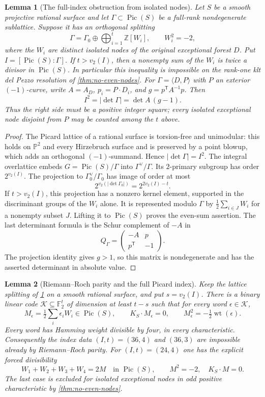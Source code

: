 \documentclass[11pt,reqno]{amsart}
\newtheorem{lemma}[lemma]{Lemma}
\theoremstyle{definition}
\theoremstyle{remark}
\DeclareMathOperator{\Pic}{Pic}
\newcommand{\PP}{\mathbb P}
\newcommand{\FF}{\mathbb F}
\newcommand{\ZZ}{\mathbb Z}
\numberwithin{equation}{section}
\begin{document}
\begin{lemma}[The full-index obstruction from isolated nodes]
\label{lem:picard-index}
Let $S$ be a smooth projective rational surface and let
$\Gamma\subset\Pic(S)$ be a full-rank nondegenerate sublattice.
Suppose it has an orthogonal splitting
\[
 \Gamma=\Gamma_0\oplus\bigoplus_{i=1}^t\ZZ[W_i],\qquad W_i^2=-2,
\]
where the $W_i$ are distinct isolated nodes of the original exceptional
forest $D$. Put $I=[\Pic(S):\Gamma]$.
If $t>v_2(I)$, then a nonempty sum of the $W_i$ is twice a divisor
in $\Pic(S)$. In particular this inequality is impossible on the
rank-one klt del Pezzo resolution of \cref{thm:no-even-nodes}.
For $\Gamma=\langle D,P\rangle$ with $P$ an exterior $(-1)$-curve,
write $A=A_D$, $p_i=P\cdot D_i$, and $g=p^{\mathsf T}A^{-1}p$.
Then
\[
 I^2=|\det\Gamma|=\det A\,(g-1).
\]
Thus the right side must be a positive integer square; every isolated
exceptional node disjoint from $P$ may be counted among the $t$ above.
\end{lemma}

\begin{proof}
The Picard lattice of a rational surface is torsion-free and unimodular:
this holds on $\PP^2$ and every Hirzebruch surface and is preserved
by a point blowup, which adds an orthogonal $(-1)$-summand.
Hence $|\det\Gamma|=I^2$.
The integral overlattice embeds
$G=\Pic(S)/\Gamma$ into $\Gamma^\vee/\Gamma$.
Its $2$-primary subgroup has order $2^{v_2(I)}$.
The projection to $\Gamma_0^\vee/\Gamma_0$ has image of order at most
\[
 2^{v_2(|\det\Gamma_0|)}=2^{2v_2(I)-t}.
\]
If $t>v_2(I)$, this projection has a nonzero kernel element, supported
in the discriminant groups of the $W_i$ alone. It is represented modulo
$\Gamma$ by $\frac12\sum_{i\in J}W_i$ for a nonempty subset $J$.
Lifting it to $\Pic(S)$ proves the even-sum assertion.
The last determinant formula is the Schur complement of $-A$ in
\[
 Q_\Gamma=\begin{pmatrix}-A&p\\p^{\mathsf T}&-1\end{pmatrix}.
\]
The projection identity gives $g>1$, so this matrix is nondegenerate and
has the asserted determinant in absolute value.
\end{proof}
\begin{lemma}[Riemann--Roch parity and the full Picard index]
\label{lem:picard-parity}
Keep the lattice splitting of \cref{lem:picard-index} on a
smooth rational surface, and put $s=v_2(I)$. There is a binary linear
code $\mathcal K\subseteq\FF_2^t$ of dimension at least $t-s$ such that
for every word $\epsilon\in\mathcal K$,
\[
 M_\epsilon=\tfrac12\sum_i\epsilon_iW_i\in\Pic(S),\qquad
 K_S\cdot M_\epsilon=0,\qquad
 M_\epsilon^2=-\tfrac12\operatorname{wt}(\epsilon).
\]
Every word has Hamming weight divisible by four, in every characteristic.
Consequently the index data $(I,t)=(36,4)$ and $(36,3)$ are impossible
already by Riemann--Roch parity. For $(I,t)=(24,4)$ one has the explicit
forced divisibility
\[
 W_1+W_2+W_3+W_4=2M\quad\text{in }\Pic(S),\qquad
 M^2=-2,\quad K_S\cdot M=0.
\]
The last case is excluded for isolated exceptional nodes in odd positive
characteristic by \cref{thm:no-even-nodes}.
\end{lemma}
\end{document}
